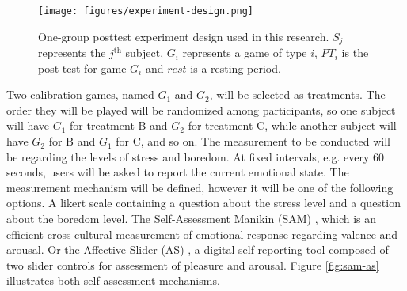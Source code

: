 \begin{figure}[ht]
    \centering
    \texttt{[image: figures/experiment-design.png]}
    \caption{One-group posttest experiment design used in this research. $S_j$ represents the $j^{\text{th}}$ subject, $G_i$ represents a game of type $i$, $PT_i$ is the post-test for game $G_i$ and $rest$ is a resting period.}
    \label{fig:closing-experiment2-design}
\end{figure}

Two calibration games, named $G_1$ and $G_2$, will be selected as treatments. The order they will be played will be randomized among participants, so one subject will have $G_1$ for treatment B and $G_2$ for treatment C, while another subject will have $G_2$ for B and $G_1$ for C, and so on. The measurement to be conducted will be regarding the levels of stress and boredom. At fixed intervals, e.g. every 60 seconds, users will be asked to report the current emotional state. The measurement mechanism will be defined, however it will be one of the following options. A likert scale containing a question about the stress level and a question about the boredom level. The Self-Assessment Manikin (SAM) \parencite{morris1995observations}, which is an efficient cross-cultural measurement of emotional response regarding valence and arousal. Or the Affective Slider (AS) \parencite{betella2016affective}, a digital self-reporting tool composed of two slider controls for assessment of pleasure and arousal. Figure \ref{fig:sam-as} illustrates both self-assessment mechanisms.

